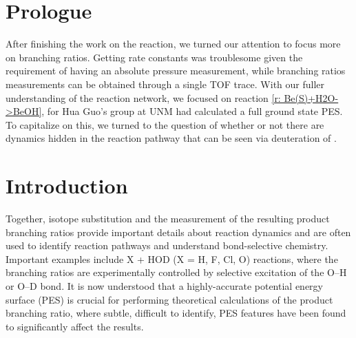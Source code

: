 \section{Prologue}

After finishing the work on the  reaction, we turned our attention to focus more on branching ratios. Getting rate constants was troublesome given the requirement of having an absolute pressure measurement, while branching ratios measurements can be obtained through a single TOF trace. With our fuller understanding of the  reaction network, we focused on reaction \ref{r: Be(S)+H2O->BeOH}, for Hua Guo's group at UNM had calculated a full ground state PES. To capitalize on this, we turned to the question of whether or not there are dynamics hidden in the reaction pathway that can be seen via deuteration of .

\section{Introduction}

Together, isotope substitution and the measurement of the resulting product branching ratios provide important details about reaction dynamics and are often used to identify reaction pathways and understand bond-selective chemistry.\cite{Crim1990,Crim1996,Zare1998} Important examples include X + HOD (X = H, F, Cl, O) reactions, where the branching ratios are experimentally controlled by selective excitation of the O–H or O–D bond.\cite{Sinha1990,Bronikowski1991,Metz1993a,Zhang1997,Song2015,Song2015a,Fu2015,Zheng2018a,Skouteris1999b} It is now understood that a highly-accurate potential energy surface (PES) is crucial for performing theoretical calculations of the product branching ratio, where subtle, difficult to identify, PES features have been found to significantly affect the results.\cite{Skouteris1999b}

